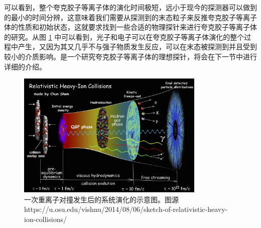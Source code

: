 可以看到，整个夸克胶子等离子体的演化时间极短，远小于现今的探测器可以做到的最小的时间分辨，这意味着我们需要从探测到的末态粒子来反推夸克胶子等离子体的性质和初始状态，这就要求找到一些合适的物理探针来进行夸克胶子等离子体的研究。从图 \ref{fig:HIC} 中可以看到，光子和电子可以在夸克胶子等离子体演化的整个过程中产生，又因为其又几乎不与强子物质发生反应，可以在末态被探测到并且受到较小的介质影响。是一个研究夸克胶子等离子体的理想探针，将会在下一节中进行详细的介绍。


\begin{figure}[htb]
    \begin{center}
    \includegraphics[width=0.8\textwidth,clip]{figures/Chapter1/little_bang-10wt2pd.jpeg}
    \end{center}
    \caption[相对论重离子演化示意图]{一次重离子对撞发生后的系统演化的示意图。图源https://u.osu.edu/vishnu/2014/08/06/sketch-of-relativistic-heavy-ion-collisions/}
    \label{fig:HIC}
\end{figure}